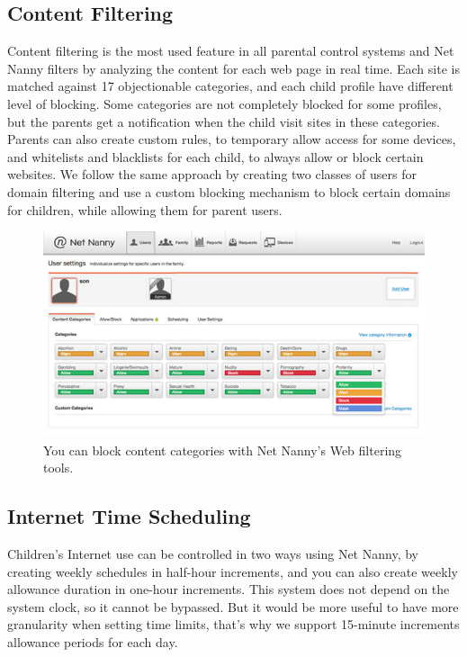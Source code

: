 \subsection{Content Filtering}

Content filtering is the most used feature in all parental control systems and Net Nanny filters by analyzing the content for each web page in real time. Each site is matched against 17 objectionable categories, and each child profile have different level of blocking. Some categories are not completely blocked for some profiles, but the parents get a notification when the child visit sites in these categories. Parents can also create custom rules, to temporary allow access for some devices, and whitelists and blacklists for each child, to always allow or block certain websites. We follow the same approach by creating two classes of users for domain filtering and use a custom blocking mechanism to block certain domains for children, while allowing them for parent users. \parencite{netNannyTomsGuide}

\begin{figure}[th]
\centering
\includegraphics[width=1\textwidth]{Figures/netnanny}
\decoRule
\caption{You can block content categories with Net Nanny's Web filtering tools.}
\label{fig:netnanny}
\end{figure}

\subsection{Internet Time Scheduling}

Children's Internet use can be controlled in two ways using Net Nanny, by creating weekly schedules in half-hour increments, and you can also create weekly allowance duration in one-hour increments. This system does not depend on the system clock, so it cannot be bypassed. But it would be more useful to have more granularity when setting time limits, that's why we support 15-minute increments allowance periods for each day.

